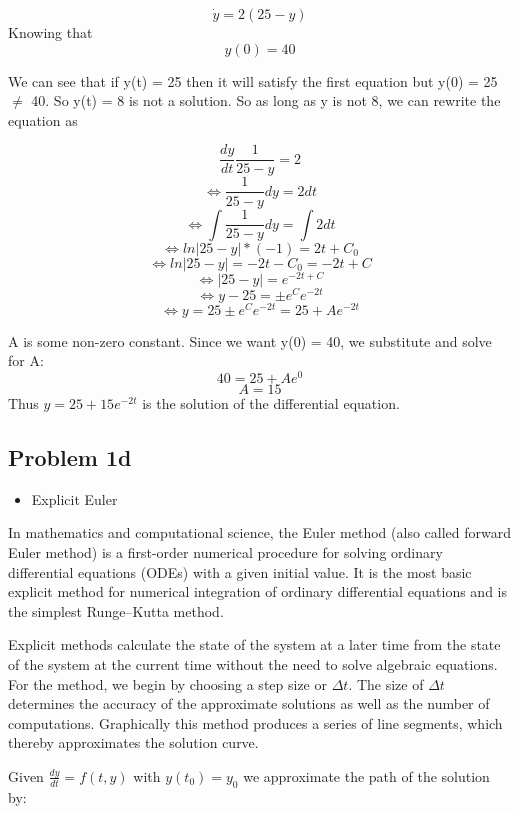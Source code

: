 \[\Dot{y} = 2(25-y)\] Knowing that
\[y(0) = 40\]

We can see that if y(t) = 25 then it will satisfy the first equation but y(0) = 25 $\neq$ 40. So y(t) = 8 is not a solution. So as long as y is not 8, we can rewrite the equation as

\[\frac{dy}{dt}\frac{1}{25-y} = 2 \]
\[\Leftrightarrow \frac{1}{25-y}dy =2dt\]
\[\Leftrightarrow  \int \frac{1}{25-y} dy = \int 2dt\]
\[\Leftrightarrow ln\lvert 25 - y\rvert * (-1) = 2t + C_0\]
\[\Leftrightarrow ln\lvert 25 - y\rvert = -2t - C_0 = -2t + C\]
\[\Leftrightarrow \lvert 25 - y\rvert = e^{-2t+C}\]
\[\Leftrightarrow y - 25 = \pm  e^C e^{-2t}\]
\[\Leftrightarrow y = 25 \pm e^C e^{-2t} = 25 + Ae^{-2t}\]

A is some non-zero constant. Since we want y(0) = 40, we substitute and solve for A:
\[40 = 25 + Ae^0\]
\[A = 15\]
Thus $y = 25 + 15e^{-2t}$ is the solution of the differential equation.

\subsection{Problem 1d}
\begin{itemize}
    \item Explicit Euler
\end{itemize}
In mathematics and computational science, the Euler method (also called forward Euler method) is a first-order numerical procedure for solving ordinary differential equations (ODEs) with a given initial value. It is the most basic explicit method for numerical integration of ordinary differential equations and is the simplest Runge–Kutta method. 

Explicit methods calculate the state of the system at a later time from the state of the system at the current time without the need to solve algebraic equations. For the method, we begin by choosing a step size or $\Delta t$. The size of $\Delta t$ determines the accuracy of the approximate solutions as well as the number of computations. Graphically this method produces a series of line segments, which thereby approximates the solution curve. 

Given $\frac{dy}{dt}=f(t,y)$ with $y(t_0)=y_0$ we approximate the path of the solution by:

